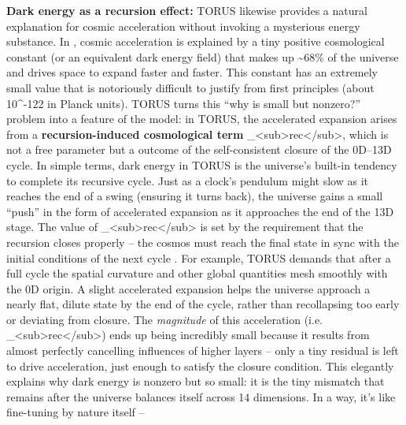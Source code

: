 \documentclass[
]{article}
\begin{document}
\textbf{Dark energy as a recursion effect:} TORUS likewise provides a
natural explanation for cosmic acceleration without invoking a
mysterious energy substance. In \LambdaCDM, cosmic acceleration is explained
by a tiny positive cosmological constant \Lambda (or an equivalent dark energy
field) that makes up \textasciitilde68\% of the universe and drives
space to expand faster and faster. This constant \Lambda has an extremely
small value that is notoriously difficult to justify from first
principles (about 10\^{}-122 in Planck units)\hspace{0pt}. TORUS turns
this ``why is \Lambda small but nonzero?'' problem into a feature of the
model: in TORUS, the accelerated expansion arises from a
\textbf{recursion-induced cosmological term}
\Lambda\_\textless sub\textgreater rec\textless/sub\textgreater, which is not
a free parameter but a outcome of the self-consistent closure of the
0D--13D cycle\hspace{0pt}. In simple terms, dark energy in TORUS is the
universe's built-in tendency to complete its recursive cycle. Just as a
clock's pendulum might slow as it reaches the end of a swing (ensuring
it turns back), the universe gains a small ``push'' in the form of
accelerated expansion as it approaches the end of the 13D stage. The
value of \Lambda\_\textless sub\textgreater rec\textless/sub\textgreater{} is
set by the requirement that the recursion closes properly -- the cosmos
must reach the final state in sync with the initial conditions of the
next cycle\hspace{0pt} \hspace{0pt}. For example, TORUS demands that
after a full cycle the spatial curvature and other global quantities
mesh smoothly with the 0D origin. A slight accelerated expansion helps
the universe approach a nearly flat, dilute state by the end of the
cycle, rather than recollapsing too early or deviating from
closure\hspace{0pt}. The \emph{magnitude} of this acceleration (i.e.
\Lambda\_\textless sub\textgreater rec\textless/sub\textgreater) ends up being
incredibly small because it results from almost perfectly cancelling
influences of higher layers -- only a tiny residual is left to drive
acceleration, just enough to satisfy the closure condition\hspace{0pt}.
This elegantly explains why dark energy is nonzero but so small: it is
the tiny mismatch that remains after the universe balances itself across
14 dimensions. In a way, it's like fine-tuning by nature itself --
\end{document}
